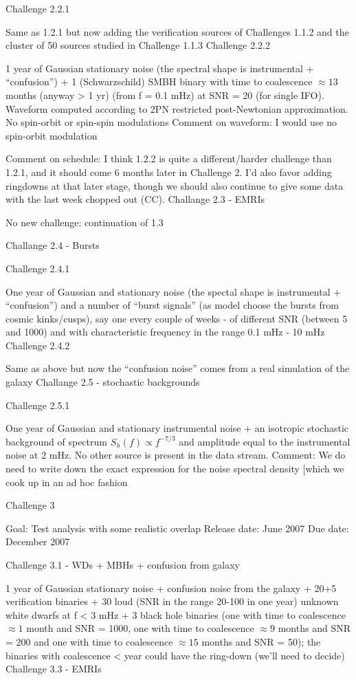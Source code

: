 \documentclass[11pt]{report}
\begin{document}
Challenge 2.2.1

Same as 1.2.1 but now adding the verification sources of Challenges 1.1.2 and the cluster of 50 sources studied in Challenge 1.1.3
Challenge 2.2.2

1 year of Gaussian stationary noise (the spectral shape is instrumental + “confusion”) + 1 (Schwarzschild) SMBH binary with time to coalescence $\approx 13$ months (anyway > 1 yr) (from f = 0.1 mHz) at SNR = 20 (for single IFO). Waveform computed according to 2PN restricted post-Newtonian approximation. No spin-orbit or spin-spin modulations
 Comment on waveform: I would use no spin-orbit modulation
 
 Comment on schedule: I think 1.2.2 is quite a different/harder challenge than 1.2.1, and it should come 6 months later in 
 Challenge 2. I'd also favor adding ringdowns at that later stage, though we should also continue to give some
 data with the last week chopped out (CC). 
Challange 2.3 - EMRIs

No new challenge: continuation of 1.3

Challange 2.4 - Bursts

Challenge 2.4.1

One year of Gaussian and stationary noise (the spectal shape is instrumental + “confusion”) and a number of “burst signals” (as model choose the bursts from cosmic kinks/cusps), say one every couple of weeks - of different SNR (between 5 and 1000) and with characteristic frequency in the range 0.1 mHz - 10 mHz
Challenge 2.4.2

Same as above but now the “confusion noise” comes from a real simulation of the galaxy
Challange 2.5 - stochastic backgrounds

Challenge 2.5.1

One year of Gaussian and stationary instrumental noise + an isotropic stochastic background of spectrum $S_h(f) \propto f^{-7/3}$ and amplitude equal to the instrumental noise at 2 mHz. No other source is present in the data stream.
  Comment: We do need to write down the exact expression for the noise spectral density [which we cook up in an ad hoc fashion


Challenge 3

Goal: Test analysis with some realistic overlap 
Release date: June 2007 
Due date: December 2007 

Challenge 3.1 - WDs + MBHs + confusion from galaxy

1 year of Gaussian stationary noise + confusion noise from the galaxy + 20+5 verification binaries + 30 loud (SNR in the range 20-100 in one year) unknown white dwarfs at f < 3 mHz + 3 black hole binaries (one with time to coalescence $\approx 1$ month and SNR = 1000, one with time to coalescence $ \approx 9$ months and SNR = 200 and one with time to coalescence $\approx 15$ months and SNR = 50); the binaries with coalescence < year could have the ring-down (we’ll need to decide)
Challenge 3.3 - EMRIs
\end{document}
